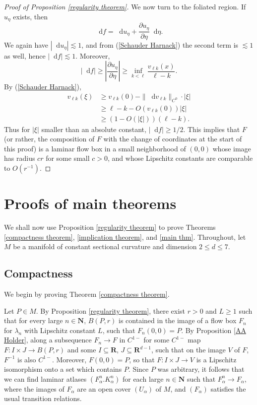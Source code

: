 \documentclass[reqno,11pt]{amsart}
\newcommand{\NN}{\mathbf{N}}
\newcommand{\RR}{\mathbf{R}}
\newcommand*\dif{\mathop{}\!\mathrm{d}}
\theoremstyle{definition}
\numberwithin{equation}{section}
\begin{document}
\begin{proof}[Proof of Proposition \ref{regularity theorem}]
We now turn to the foliated region. If $u_\eta$ exists, then
$$\dif f = \dif u_\eta + \frac{\partial u_\eta}{\partial \eta} \dif \eta.$$
We again have $|\dif u_\eta| \lesssim 1$, and from (\ref{Schauder Harnack}) the second term is $\lesssim 1$ as well, hence $|\dif f| \lesssim 1$.
Moreover,
$$|\dif f| \geq \left|\frac{\partial u_\eta}{\partial \eta}\right| \geq \inf_{k < \ell} \frac{v_{\ell k}(x)}{\ell - k}.$$
By (\ref{Schauder Harnack}),
\begin{align*}
	v_{\ell k}(\xi) &\geq v_{\ell k}(0) - \|\dif v_{\ell k}\|_{C^0} \cdot |\xi| \\
	&\geq \ell - k - O(v_{\ell k}(0)) |\xi| \\
	&\geq (1 - O(|\xi|)) (\ell - k).
\end{align*}
Thus for $|\xi|$ smaller than an absolute constant, $|\dif f| \geq 1/2$.
This implies that $F$ (or rather, the composition of $F$ with the change of coordinates at the start of this proof) is a laminar flow box in a small neighborhood of $(0, 0)$ whose image has radius $cr$ for some small $c > 0$, and whose Lipschitz constants are comparable to $O(r^{-1})$.
\end{proof}

\section{Proofs of main theorems}\label{CompactnessSec}
We shall now use Proposition \ref{regularity theorem} to prove Theorems \ref{compactness theorem}, \ref{implication theorem}, and \ref{main thm}.
Throughout, let $M$ be a manifold of constant sectional curvature and dimension $2 \leq d \leq 7$.

\subsection{Compactness}
We begin by proving Theorem \ref{compactness theorem}.

Let $P \in M$.
By Proposition \ref{regularity theorem}, there exist $r > 0$ and $L \geq 1$ such that for every large $n \in \NN$, $B(P, r)$ is contained in the image of a flow box $F_n$ for $\lambda_n$ with Lipschitz constant $L$, such that $F_n(0, 0) = P$.
By Proposition \ref{AA Holder}, along a subsequence $F_n \to F$ in $C^{1-}$ for some $C^{1-}$ map $F: I \times J \to B(P, r)$ and some $I \subseteq \RR$, $J \subseteq \RR^{d - 1}$, such that on the image $V$ of $F$, $F^{-1}$ is also $C^{1-}$.
Moreover, $F(0, 0) = P$, so that $F: I \times J \to V$ is a Lipschitz isomorphism onto a set which contains $P$.
Since $P$ was arbitrary, it follows that we can find laminar atlases $(F_\alpha^n. K_\alpha^n)$ for each large $n \in \NN$ such that $F_\alpha^n \to F_\alpha$, where the images of $F_\alpha$ are an open cover $(U_\alpha)$ of $M$, and $(F_\alpha)$ satisfies the usual transition relations.
\end{document}
